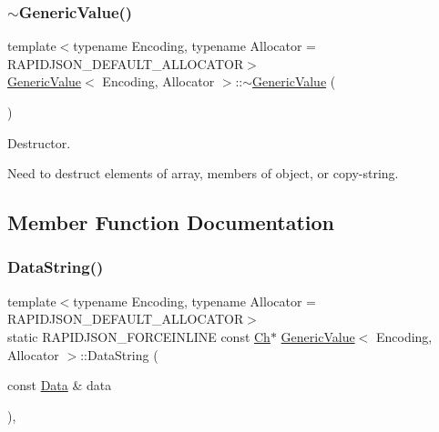 \subsubsection{\texorpdfstring{$\sim$\+Generic\+Value()}{~GenericValue()}}
{\footnotesize\ttfamily template$<$typename Encoding, typename Allocator = R\+A\+P\+I\+D\+J\+S\+O\+N\+\_\+\+D\+E\+F\+A\+U\+L\+T\+\_\+\+A\+L\+L\+O\+C\+A\+T\+OR$>$ \\
\hyperlink{classGenericValue}{Generic\+Value}$<$ Encoding, Allocator $>$\+::$\sim$\hyperlink{classGenericValue}{Generic\+Value} (\begin{DoxyParamCaption}{ }\end{DoxyParamCaption})\hspace{0.3cm}{\ttfamily [inline]}}



Destructor. 

Need to destruct elements of array, members of object, or copy-\/string. 

\subsection{Member Function Documentation}
\mbox{\label{classGenericValue_ad5b083fc57cf2d89db29209a18ee72cb}} 
\subsubsection{\texorpdfstring{Data\+String()}{DataString()}}
{\footnotesize\ttfamily template$<$typename Encoding, typename Allocator = R\+A\+P\+I\+D\+J\+S\+O\+N\+\_\+\+D\+E\+F\+A\+U\+L\+T\+\_\+\+A\+L\+L\+O\+C\+A\+T\+OR$>$ \\
static R\+A\+P\+I\+D\+J\+S\+O\+N\+\_\+\+F\+O\+R\+C\+E\+I\+N\+L\+I\+NE const \hyperlink{classGenericValue_ade0e0ce64ccd5d852da57a35e720bafb}{Ch}$\ast$ \hyperlink{classGenericValue}{Generic\+Value}$<$ Encoding, Allocator $>$\+::Data\+String (\begin{DoxyParamCaption}\item[{const \hyperlink{unionGenericValue_1_1Data}{Data} \&}]{data }\end{DoxyParamCaption})\hspace{0.3cm}{\ttfamily [inline]}, {\ttfamily [static]}}

\mbox{\label{classGenericValue_a1373c36e6bdffc6ed79143f47c1024ee}} 
